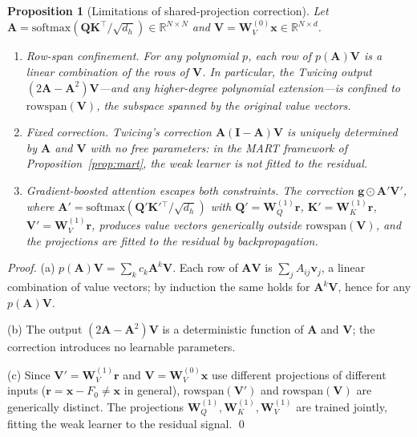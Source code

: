 \documentclass{article}
\newtheorem{proposition}{Proposition}
\theoremstyle{definition}
\begin{document}
\begin{proposition}[Limitations of shared-projection correction]
\label{prop:separate}
Let $\mathbf{A} = \mathrm{softmax}(\mathbf{Q}\mathbf{K}^\top / \sqrt{d_h}) \in \mathbb{R}^{N \times N}$ and $\mathbf{V} = \mathbf{W}_V^{(0)}\mathbf{x} \in \mathbb{R}^{N \times d}$.
\begin{enumerate}
    \item[(a)] \emph{Row-span confinement.}
    For any polynomial $p$, each row of $p(\mathbf{A})\mathbf{V}$ is a linear combination of the rows of $\mathbf{V}$.
    In particular, the Twicing output $(2\mathbf{A} - \mathbf{A}^2)\mathbf{V}$---and any higher-degree polynomial extension---is confined to $\mathrm{rowspan}(\mathbf{V})$, the subspace spanned by the original value vectors.

    \item[(b)] \emph{Fixed correction.}
    Twicing's correction $\mathbf{A}(\mathbf{I} - \mathbf{A})\mathbf{V}$ is uniquely determined by $\mathbf{A}$ and $\mathbf{V}$ with no free parameters: in the MART framework of Proposition~\ref{prop:mart}, the weak learner is not fitted to the residual.

    \item[(c)] \emph{Gradient-boosted attention escapes both constraints.}
    The correction $\mathbf{g} \odot \mathbf{A}'\mathbf{V}'$, where $\mathbf{A}' = \mathrm{softmax}(\mathbf{Q}'\mathbf{K}'{}^\top / \sqrt{d_h})$ with $\mathbf{Q}' = \mathbf{W}_Q^{(1)}\mathbf{r}$, $\mathbf{K}' = \mathbf{W}_K^{(1)}\mathbf{r}$, $\mathbf{V}' = \mathbf{W}_V^{(1)}\mathbf{r}$, produces value vectors generically outside $\mathrm{rowspan}(\mathbf{V})$, and the projections are fitted to the residual by backpropagation.
\end{enumerate}
\end{proposition}

\begin{proof}
(a) $p(\mathbf{A})\mathbf{V} = \sum_k c_k \mathbf{A}^k\mathbf{V}$.
Each row of $\mathbf{A}\mathbf{V}$ is $\sum_j A_{ij}\mathbf{v}_j$, a linear combination of value vectors; by induction the same holds for $\mathbf{A}^k\mathbf{V}$, hence for any $p(\mathbf{A})\mathbf{V}$.

(b) The output $(2\mathbf{A} - \mathbf{A}^2)\mathbf{V}$ is a deterministic function of $\mathbf{A}$ and $\mathbf{V}$; the correction introduces no learnable parameters.

(c) Since $\mathbf{V}' = \mathbf{W}_V^{(1)}\mathbf{r}$ and $\mathbf{V} = \mathbf{W}_V^{(0)}\mathbf{x}$ use different projections of different inputs ($\mathbf{r} = \mathbf{x} - F_0 \neq \mathbf{x}$ in general), $\mathrm{rowspan}(\mathbf{V}')$ and $\mathrm{rowspan}(\mathbf{V})$ are generically distinct.
The projections $\mathbf{W}_Q^{(1)}, \mathbf{W}_K^{(1)}, \mathbf{W}_V^{(1)}$ are trained jointly, fitting the weak learner to the residual signal. \qed
\end{proof}
\end{document}
